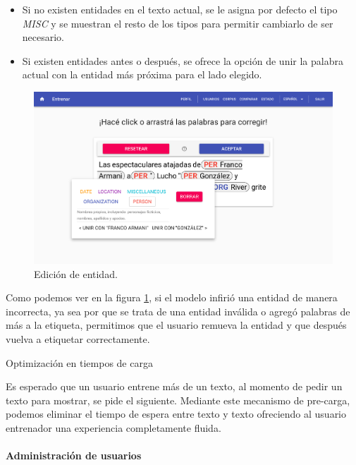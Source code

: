 \documentclass[12pt,a4paper,]{scrartcl}
\providecommand{\tightlist}{%
  \setlength{\itemsep}{0pt}\setlength{\parskip}{0pt}}
\let\oldparagraph\paragraph
\renewcommand{\paragraph}[1]{\oldparagraph{#1}\mbox{}}
\begin{document}
\begin{itemize}
\tightlist
\item
  Si no existen entidades en el texto actual, se le asigna por defecto el tipo \emph{MISC} y se muestran el resto de los tipos para permitir cambiarlo de ser necesario.
\item
  Si existen entidades antes o después, se ofrece la opción de unir la palabra actual con la entidad más próxima para el lado elegido.
\end{itemize}

\begin{figure}[H]

{\centering \includegraphics{assets/logic/train-popup.pdf} 

}

\caption{Edición de entidad.}\label{fig:logic-train-popup}
\end{figure}

Como podemos ver en la figura \ref{fig:logic-train-popup}, si el modelo infirió una entidad de manera incorrecta, ya sea por que se trata de una entidad inválida o agregó palabras de más a la etiqueta, permitimos que el usuario remueva la entidad y que después vuelva a etiquetar correctamente.

Optimización en tiempos de carga

Es esperado que un usuario entrene más de un texto, al momento de pedir un texto para mostrar, se pide el siguiente. Mediante este mecanismo de pre-carga, podemos eliminar el tiempo de espera entre texto y texto ofreciendo al usuario entrenador una experiencia completamente fluida.

\hypertarget{administraciuxf3n-de-usuarios}{%
\paragraph{Administración de usuarios}\label{administraciuxf3n-de-usuarios}}
\end{document}

